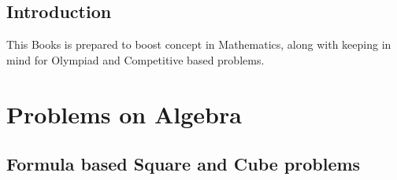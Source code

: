\documentclass[12pt,a4paper,twoside]{book}
\title{\LARGE \TITLE \\ [10pt]
\large \SUBTITLE
}
\author{\AUTHOR}
\date{\DATE}
\begin{document}
\maketitle
\tableofcontents
\chapter*{Introduction}
  
This Books is prepared to boost concept in Mathematics, along with keeping in mind for Olympiad and Competitive based problems.
\part{Problems on Algebra}
\chapter[Square and Cubes]{Formula based Square and Cube problems}
\vspace*{-1cm}
\end{document}
